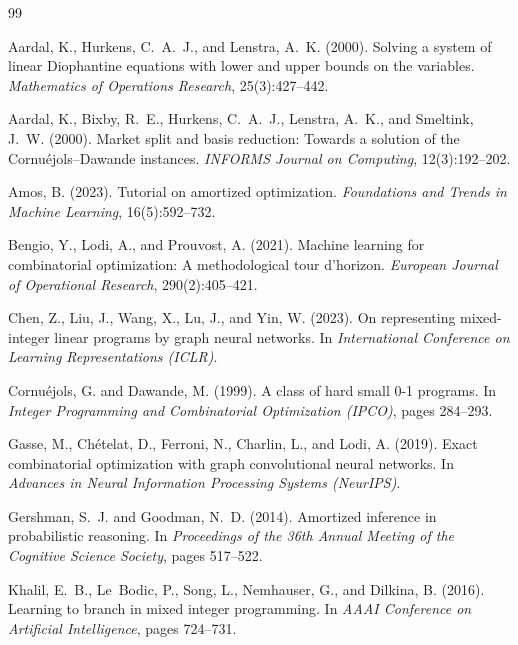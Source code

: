 \documentclass[12pt]{article}
\begin{document}
\begin{thebibliography}{99}

Aardal, K., Hurkens, C.~A.~J., and Lenstra, A.~K. (2000).
Solving a system of linear Diophantine equations with lower and upper bounds on the variables.
\emph{Mathematics of Operations Research}, 25(3):427--442.

Aardal, K., Bixby, R.~E., Hurkens, C.~A.~J., Lenstra, A.~K., and Smeltink, J.~W. (2000).
Market split and basis reduction: Towards a solution of the Cornu\'ejols--Dawande instances.
\emph{INFORMS Journal on Computing}, 12(3):192--202.

Amos, B. (2023).
Tutorial on amortized optimization.
\emph{Foundations and Trends in Machine Learning}, 16(5):592--732.

Bengio, Y., Lodi, A., and Prouvost, A. (2021).
Machine learning for combinatorial optimization: A methodological tour d'horizon.
\emph{European Journal of Operational Research}, 290(2):405--421.

Chen, Z., Liu, J., Wang, X., Lu, J., and Yin, W. (2023).
On representing mixed-integer linear programs by graph neural networks.
In \emph{International Conference on Learning Representations (ICLR)}.

Cornu\'ejols, G. and Dawande, M. (1999).
A class of hard small 0-1 programs.
In \emph{Integer Programming and Combinatorial Optimization (IPCO)}, pages 284--293.

Gasse, M., Ch\'etelat, D., Ferroni, N., Charlin, L., and Lodi, A. (2019).
Exact combinatorial optimization with graph convolutional neural networks.
In \emph{Advances in Neural Information Processing Systems (NeurIPS)}.

Gershman, S.~J. and Goodman, N.~D. (2014).
Amortized inference in probabilistic reasoning.
In \emph{Proceedings of the 36th Annual Meeting of the Cognitive Science Society}, pages 517--522.

Khalil, E.~B., Le~Bodic, P., Song, L., Nemhauser, G., and Dilkina, B. (2016).
Learning to branch in mixed integer programming.
In \emph{AAAI Conference on Artificial Intelligence}, pages 724--731.


\end{thebibliography}
\end{document}
